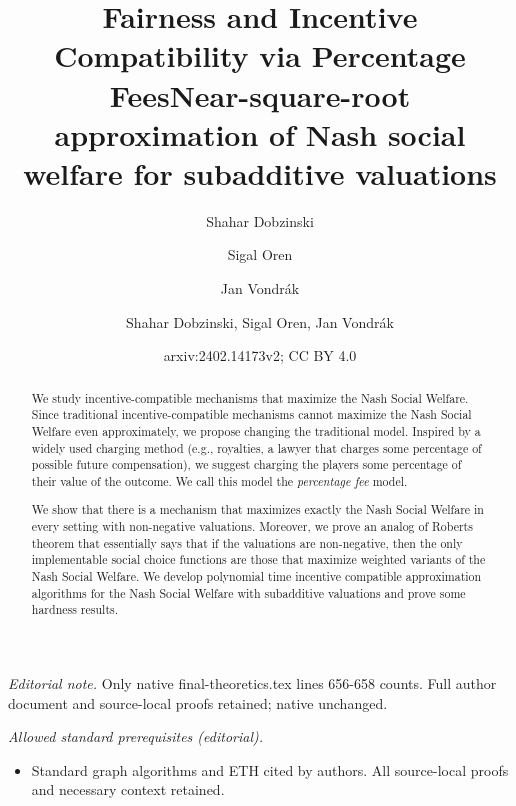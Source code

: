 \documentclass{article}
\author{Shahar Dobzinski \and Sigal Oren \and Jan Vondrák}\date{}
\title{Fairness and Incentive Compatibility via Percentage Fees}
\title{Near-square-root approximation of Nash social welfare for subadditive valuations}
\author{Shahar Dobzinski, Sigal Oren, Jan Vondrák}
\date{arxiv:2402.14173v2; CC BY 4.0}
\begin{document}
\maketitle
\noindent\textit{Editorial note.} Only native final-theoretics.tex lines 656-658 counts. Full author document and source-local proofs retained; native unchanged.\par\medskip
\noindent\textit{Allowed standard prerequisites (editorial).}\begin{itemize}
\item Standard graph algorithms and ETH cited by authors. All source-local proofs and necessary context retained.
\end{itemize}\medskip




\maketitle

\begin{abstract}
We study incentive-compatible mechanisms that maximize the Nash Social Welfare. Since traditional incentive-compatible mechanisms cannot maximize the Nash Social Welfare even approximately, we propose changing the traditional model. Inspired by a widely used charging method (e.g., royalties, a lawyer that charges some percentage of possible future compensation), we suggest charging the players some percentage of their value of the outcome. We call this model the \emph{percentage fee} model.

We show that there is a mechanism that maximizes exactly the Nash Social Welfare in every setting with non-negative valuations. Moreover, we prove an analog of Roberts theorem that essentially says that if the valuations are non-negative, then the only implementable social choice functions are those that maximize weighted variants of the Nash Social Welfare. We develop polynomial time incentive compatible approximation algorithms for the Nash Social Welfare with subadditive valuations and prove some hardness results. 
\end{abstract}
\end{document}
